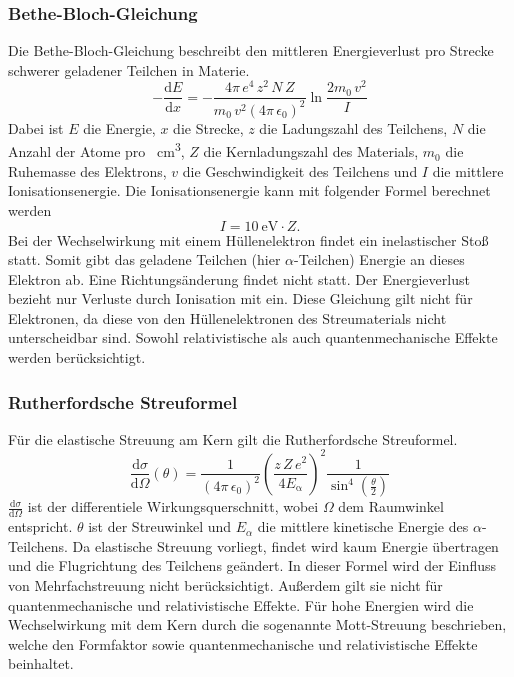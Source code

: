 \subsubsection{Bethe-Bloch-Gleichung}
Die Bethe-Bloch-Gleichung beschreibt den mittleren Energieverlust pro Strecke schwerer geladener Teilchen in Materie.
\begin{equation}
  \label{eqn:bethe}
   -\frac{\mathrm{d}E}{\mathrm{d}x}=-\frac{4\pi\,e^4\,z^2\,N\,Z}{m_0\, v^2(4\pi\,\epsilon_0)^2} \ln \frac{2m_0\,v^2}{I}
\end{equation}
Dabei ist $E$ die Energie, $x$ die Strecke, $z$ die Ladungszahl des Teilchens, $N$ die Anzahl der Atome pro \SI{}{\cubic\centi\meter}, $Z$ die Kernladungszahl des Materials, $m_0$ die Ruhemasse des Elektrons, $v$ die Geschwindigkeit des Teilchens und $I$ die mittlere Ionisationsenergie. Die Ionisationsenergie kann mit folgender Formel berechnet werden
\begin{equation}
I= \SI{10}{\electronvolt}\cdot Z.
\end{equation}
Bei der Wechselwirkung mit einem Hüllenelektron findet ein inelastischer Stoß statt. Somit gibt das geladene Teilchen (hier $\alpha$-Teilchen) Energie an dieses Elektron ab. Eine Richtungsänderung findet nicht statt.
Der Energieverlust bezieht nur Verluste durch Ionisation mit ein. Diese Gleichung gilt nicht für Elektronen, da diese von den Hüllenelektronen des Streumaterials nicht unterscheidbar sind. Sowohl relativistische als auch quantenmechanische Effekte werden berücksichtigt.

\subsubsection{Rutherfordsche Streuformel}
Für die elastische Streuung am Kern gilt die Rutherfordsche Streuformel.
\begin{equation}
  \label{eqn:rutherford}
\frac{\mathrm{d}\sigma}{\mathrm{d}\Omega}(\theta)=\frac{1}{(4\pi\,\epsilon_0)^2}\left(\frac{z\,Z\,e^2}{4E_\mathrm{\alpha}}\right)^2 \frac{1}{\sin^4\left(\frac{\theta}{2}\right)}
\end{equation}
$\frac{\mathrm{d}\sigma}{\mathrm{d}\Omega}$ ist der differentiele Wirkungsquerschnitt, wobei $\Omega$ dem Raumwinkel entspricht. $\theta$ ist der Streuwinkel und $E_{\alpha}$ die mittlere kinetische Energie des $\alpha$-Teilchens. Da elastische Streuung vorliegt, findet wird kaum Energie übertragen und die Flugrichtung des Teilchens geändert.
In dieser Formel wird der Einfluss von Mehrfachstreuung nicht berücksichtigt. Außerdem gilt sie nicht für quantenmechanische und relativistische Effekte. Für hohe Energien wird die
Wechselwirkung mit dem Kern durch die sogenannte Mott-Streuung beschrieben, welche den Formfaktor sowie quantenmechanische und relativistische Effekte beinhaltet.

